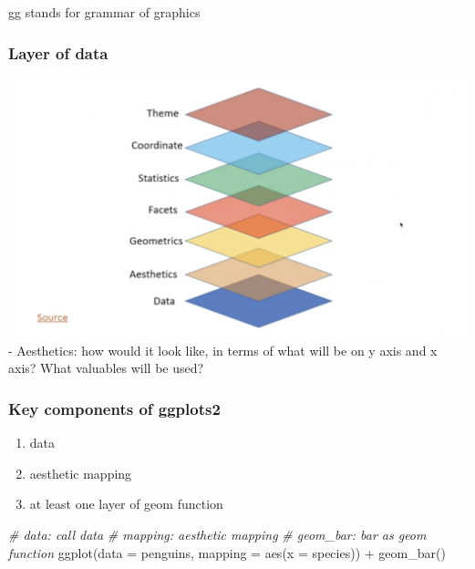 \documentclass[
]{article}
\newenvironment{Shaded}{\begin{snugshade}}{\end{snugshade}}
\newcommand{\AttributeTok}[1]{\textcolor[rgb]{0.77,0.63,0.00}{#1}}
\newcommand{\CommentTok}[1]{\textcolor[rgb]{0.56,0.35,0.01}{\textit{#1}}}
\newcommand{\FunctionTok}[1]{\textcolor[rgb]{0.00,0.00,0.00}{#1}}
\newcommand{\NormalTok}[1]{#1}
\newcommand{\SpecialCharTok}[1]{\textcolor[rgb]{0.00,0.00,0.00}{#1}}
\providecommand{\tightlist}{%
  \setlength{\itemsep}{0pt}\setlength{\parskip}{0pt}}
\begin{document}
gg stands for grammar of graphics

\hypertarget{layer-of-data}{%
\subsubsection{Layer of data}\label{layer-of-data}}

\includegraphics[width=29.58in]{layer_of_data} - Aesthetics: how would
it look like, in terms of what will be on y axis and x axis? What
valuables will be used?

\hypertarget{key-components-of-ggplots2}{%
\subsubsection{Key components of
ggplots2}\label{key-components-of-ggplots2}}

\begin{enumerate}
\def\labelenumi{\arabic{enumi}.}
\tightlist
\item
  data
\item
  aesthetic mapping
\item
  at least one layer of geom function
\end{enumerate}

\begin{Shaded}
\begin{Highlighting}[]
\CommentTok{\# data: call data}
\CommentTok{\# mapping: aesthetic mapping}
\CommentTok{\# geom\_bar: bar as geom function}
\FunctionTok{ggplot}\NormalTok{(}\AttributeTok{data =}\NormalTok{ penguins, }\AttributeTok{mapping =} \FunctionTok{aes}\NormalTok{(}\AttributeTok{x =}\NormalTok{ species)) }\SpecialCharTok{+} \FunctionTok{geom\_bar}\NormalTok{()}
\end{Highlighting}
\end{Shaded}
\end{document}
